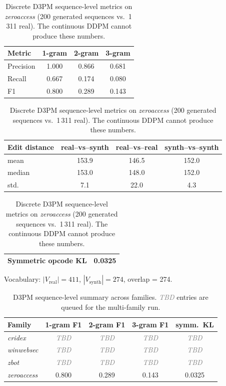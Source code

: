 \documentclass[runningheads]{llncs}
\newcommand{\todoval}{\textcolor{gray}{\textit{TBD}}}
\begin{document}
\begin{table}[h]
\centering
\caption{Discrete D3PM sequence-level metrics on \emph{zeroaccess}
(200 generated sequences vs.\ 1\,311 real). The continuous DDPM cannot
produce these numbers.}
\label{tab:d3pm-seq}
\begin{tabular}{lccc}
\toprule
Metric & 1-gram & 2-gram & 3-gram \\
\midrule
Precision & 1.000 & 0.866 & 0.681 \\
Recall    & 0.667 & 0.174 & 0.080 \\
F1        & 0.800 & 0.289 & 0.143 \\
\bottomrule
\end{tabular}

\vspace{0.6em}
\begin{tabular}{lccc}
\toprule
Edit distance & real--vs--synth & real--vs--real & synth--vs--synth \\
\midrule
mean   & 153.9 & 146.5 & 152.0 \\
median & 153.0 & 148.0 & 152.0 \\
std.   &   7.1 &  22.0 &   4.3 \\
\bottomrule
\end{tabular}

\vspace{0.6em}
\begin{tabular}{lc}
\toprule
Symmetric opcode KL & 0.0325 \\
\bottomrule
\end{tabular}

\vspace{0.3em}\noindent
Vocabulary: $|V_\text{real}|=411$, $|V_\text{synth}|=274$, overlap = 274.
\end{table}

\begin{table}[h]
\centering
\caption{D3PM sequence-level summary across families. \todoval{} entries are
queued for the multi-family run.}
\label{tab:d3pm-seq-multi}
\begin{tabular}{lcccc}
\toprule
Family & 1-gram F1 & 2-gram F1 & 3-gram F1 & symm.\ KL \\
\midrule
\emph{cridex}      & \todoval & \todoval & \todoval & \todoval \\
\emph{winwebsec}   & \todoval & \todoval & \todoval & \todoval \\
\emph{zbot}        & \todoval & \todoval & \todoval & \todoval \\
\emph{zeroaccess}  & 0.800    & 0.289    & 0.143    & 0.0325   \\
\bottomrule
\end{tabular}
\end{table}
\end{document}
